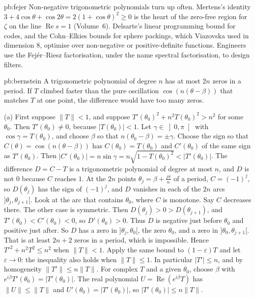 \begin{solution}{pb:fejer}
\leads Non-negative trigonometric polynomials turn up often. Mertens's identity $3+4\cos\theta+\cos2\theta=2(1+\cos\theta)^2\ge0$ is the heart of the zero-free
region for $\zeta$ on the line $\operatorname{Re}s=1$ (Volume~6). Delsarte's linear programming bound for codes, and the Cohn--Elkies bounds for sphere packings,
which Viazovska used in dimension $8$, optimise over non-negative or positive-definite functions. Engineers use the Fejér--Riesz
factorisation, under the name spectral factorisation, to design filters.
\end{solution}

\begin{solution}{pb:bernstein}
\idea A trigonometric polynomial of degree $n$ has at most $2n$ zeros in a period. If $T$ climbed faster than the pure oscillation
$\cos(n(\theta-\beta))$ that matches $T$ at one point, the difference would have too many zeros.

\writeup (a) First suppose $\|T\|<1$, and suppose $T'(\theta_0)^2+n^2T(\theta_0)^2>n^2$ for some $\theta_0$. Then $T'(\theta_0)\ne0$, because $|T(\theta_0)|<1$. Let $\gamma\in\left]0,\pi\right[$ with
$\cos\gamma=T(\theta_0)$, and choose $\beta$ so that $n(\theta_0-\beta)=\pm\gamma$. Choose the sign so that $C(\theta)=\cos(n(\theta-\beta))$ has $C(\theta_0)=T(\theta_0)$ and $C'(\theta_0)$ of the
same sign as $T'(\theta_0)$. Then $|C'(\theta_0)|=n\sin\gamma=n\sqrt{1-T(\theta_0)^2}<|T'(\theta_0)|$. The difference $D=C-T$ is a trigonometric polynomial of degree at most
$n$, and $D$ is not $0$ because $C$ reaches $1$. At the $2n$ points $\theta_j=\beta+\frac{j\pi}n$ of a period, $C=(-1)^j$, so $D(\theta_j)$ has the sign of $(-1)^j$, and $D$ vanishes in
each of the $2n$ arcs $]\theta_j,\theta_{j+1}[$. Look at the arc that contains $\theta_0$, where $C$ is monotone. Say $C$ decreases there. The other case
is symmetric. Then $D(\theta_j)>0>D(\theta_{j+1})$, and $T'(\theta_0)<C'(\theta_0)<0$, so $D'(\theta_0)>0$. Thus $D$ is negative just before $\theta_0$ and positive just after. So $D$
has a zero in $]\theta_j,\theta_0[$, the zero $\theta_0$, and a zero in $]\theta_0,\theta_{j+1}[$. That is at least $2n+2$ zeros in a period, which is impossible. Hence
$T'^2+n^2T^2\le n^2$ when $\|T\|<1$. Apply the same bound to $(1-\varepsilon)T$ and let $\varepsilon\to0$: the inequality also holds when $\|T\|\le1$. In particular $|T'|\le n$, and by
homogeneity $\|T'\|\le n\|T\|$. For complex $T$ and a given $\theta_0$, choose $\beta$ with $e^{i\beta}T'(\theta_0)=|T'(\theta_0)|$. The real polynomial $U=\operatorname{Re}(e^{i\beta}T)$ has
$\|U\|\le\|T\|$ and $U'(\theta_0)=|T'(\theta_0)|$, so $|T'(\theta_0)|\le n\|T\|$.


\end{solution}

